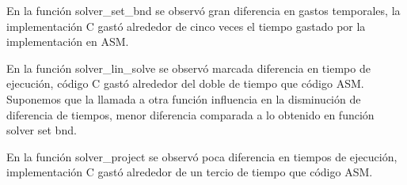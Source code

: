 \par En la función solver\_set\_bnd se observó gran diferencia en gastos temporales, la implementación C gastó alrededor de cinco veces el tiempo gastado por la implementación en ASM.\newline
\par En la función solver\_lin\_solve se observó marcada diferencia en tiempo de ejecución, código C gastó alrededor del doble de tiempo que código ASM. Suponemos que la llamada a otra función influencia en la disminución de diferencia de tiempos, menor diferencia comparada a lo obtenido en función solver set bnd.\newline
\par En la función solver\_project se observó poca diferencia en tiempos de ejecución, implementación C gastó alrededor de un tercio de tiempo que código ASM.